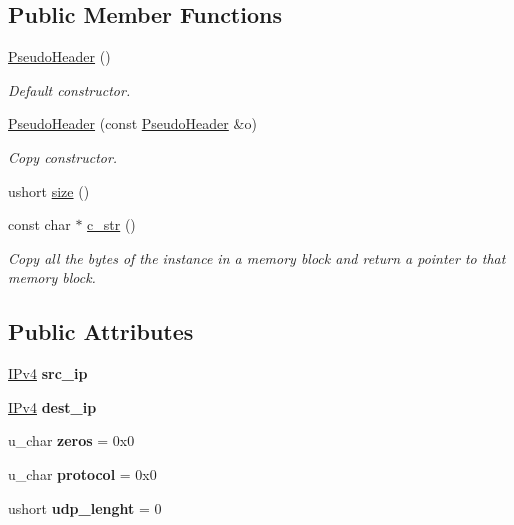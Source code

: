 \subsection*{Public Member Functions}
\begin{DoxyCompactItemize}
\item 
\hyperlink{structudp_1_1PseudoHeader_a34e596707cd0cf0c8b59ddff5febe8a2}{Pseudo\+Header} ()
\begin{DoxyCompactList}\small\item\em Default constructor. \end{DoxyCompactList}\item 
\hyperlink{structudp_1_1PseudoHeader_a16395f2d397c61eb38d6b6ead67137c0}{Pseudo\+Header} (const \hyperlink{structudp_1_1PseudoHeader}{Pseudo\+Header} \&o)
\begin{DoxyCompactList}\small\item\em Copy constructor. \end{DoxyCompactList}\item 
ushort \hyperlink{structudp_1_1PseudoHeader_a13d65dbc9db37dce995b37d5aacaaa36}{size} ()
\item 
const char $\ast$ \hyperlink{structudp_1_1PseudoHeader_a89fa524fdc3fe6c2cf151e5c31c1bbcc}{c\+\_\+str} ()
\begin{DoxyCompactList}\small\item\em Copy all the bytes of the instance in a memory block and return a pointer to that memory block. \end{DoxyCompactList}\end{DoxyCompactItemize}
\subsection*{Public Attributes}
\begin{DoxyCompactItemize}
\item 
\hyperlink{structIPv4}{I\+Pv4} {\bfseries src\+\_\+ip}\hypertarget{structudp_1_1PseudoHeader_aafc5eb8cfafb7ce922e1678c359f55bb}{}\label{structudp_1_1PseudoHeader_aafc5eb8cfafb7ce922e1678c359f55bb}

\item 
\hyperlink{structIPv4}{I\+Pv4} {\bfseries dest\+\_\+ip}\hypertarget{structudp_1_1PseudoHeader_abebb8b9c17774287930affd0c3c471a8}{}\label{structudp_1_1PseudoHeader_abebb8b9c17774287930affd0c3c471a8}

\item 
u\+\_\+char {\bfseries zeros} = 0x0\hypertarget{structudp_1_1PseudoHeader_a51cdc408b4e23b6d8dc3d835dcef9291}{}\label{structudp_1_1PseudoHeader_a51cdc408b4e23b6d8dc3d835dcef9291}

\item 
u\+\_\+char {\bfseries protocol} = 0x0\hypertarget{structudp_1_1PseudoHeader_adcacf0d1e8481cd171121f3668f7c240}{}\label{structudp_1_1PseudoHeader_adcacf0d1e8481cd171121f3668f7c240}

\item 
ushort {\bfseries udp\+\_\+lenght} = 0\hypertarget{structudp_1_1PseudoHeader_adc2636cd18c48abaadc658453ff1b019}{}\label{structudp_1_1PseudoHeader_adc2636cd18c48abaadc658453ff1b019}

\end{DoxyCompactItemize}


